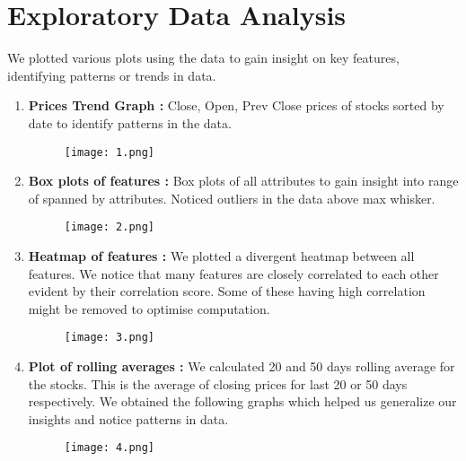 \documentclass[conference]{IEEEtran}
\begin{document}
\section{Exploratory Data Analysis}
We plotted various plots using the data to gain insight on key features, identifying patterns or trends in data.
\begin{enumerate}
    \item \textbf{Prices Trend Graph : }
        Close, Open, Prev Close prices of stocks sorted by date to identify patterns in the data.
        \vspace{-0.3cm}
        \begin{figure}[H]
        \centering
        \texttt{[image: 1.png]}
        \label{fig:distribution_categories}
        \end{figure}
        \vspace{-0.3cm}
    \item \textbf{Box plots of features : }
        Box plots of all attributes to gain insight into range of spanned by attributes. Noticed outliers in the data above max whisker.
        \vspace{-0.3cm}
        \begin{figure}[H]
        \centering
        \texttt{[image: 2.png]}
        \label{fig:distribution_categories}
        \end{figure}
        \vspace{-0.3cm}
    \item \textbf{Heatmap of features : }
        We plotted a divergent heatmap between all features. We notice that many features are closely correlated to each other evident by their correlation score. Some of these having high correlation might be removed to optimise computation.
        \vspace{-0.3cm}
        \begin{figure}[H]
        \centering
        \texttt{[image: 3.png]}
        \label{fig:distribution_categories}
        \end{figure}
        \vspace{-0.3cm}
    \item \textbf{Plot of rolling averages : }
        We calculated 20 and 50 days rolling average for the stocks. This is the average of closing prices for last 20 or 50 days respectively. We obtained the following graphs which helped us generalize our insights and notice patterns in data.
        \vspace{-0.3cm}
        \begin{figure}[H]
        \centering
        \texttt{[image: 4.png]}
        \label{fig:distribution_categories}
        \end{figure}
        \vspace{-0.3cm}
\end{enumerate}
\end{document}
